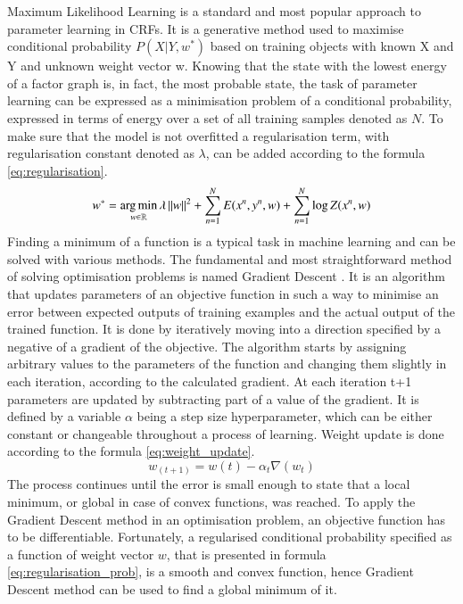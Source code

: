 Maximum Likelihood Learning is a standard and most popular approach to parameter learning in CRFs. It is a generative method used to maximise conditional probability $P(X|Y,w^*)$ based on training objects with known X and Y and unknown weight vector w. Knowing that the state with the lowest energy of a factor graph is, in fact, the most probable state, the task of parameter learning can be expressed as a minimisation problem of a conditional probability, expressed in terms of energy over a set of all training samples denoted as $N$. To make sure that the model is not overfitted a regularisation term, with regularisation constant denoted as $\lambda$, can be added according to the formula \ref{eq:regularisation}.
\begin{equation}
    \label{eq:regularisation}
    w^* = \operatorname*{arg\,min}_{w \in \mathbb{R}}{\lambda \left \| w \right \|^2} + \sum_{n=1}^{N}{E(x^n,y^n,w)} + \sum_{n=1}^{N}{\log{Z}(x^n,w)}
\end{equation}
Finding a minimum of a function is a typical task in machine learning and can be solved with various methods. The fundamental and most straightforward method of solving optimisation problems is named Gradient Descent \cite{optimisation_deep_learning}. It is an algorithm that updates parameters of an objective function in such a way to minimise an error between expected outputs of training examples and the actual output of the trained function. It is done by iteratively moving into a direction specified by a negative of a gradient of the objective. The algorithm starts by assigning arbitrary values to the parameters of the function and changing them slightly in each iteration, according to the calculated gradient. At each iteration t+1 parameters are updated by subtracting part of a value of the gradient. It is defined by a variable $\alpha$ being a step size hyperparameter, which can be either constant or changeable throughout a process of learning. Weight update is done according to the formula \ref{eq:weight_update}.
\begin{equation}
    \label{eq:weight_update}
    w_{(t+1)} = w(t) - \alpha_t \nabla (w_t)
\end{equation}
The process continues until the error is small enough to state that a local minimum, or global in case of convex functions, was reached. To apply the Gradient Descent method in an optimisation problem, an objective function has to be differentiable. Fortunately, a regularised conditional probability specified as a function of weight vector $w$, that is presented in formula \ref{eq:regularisation_prob}, is a smooth and convex function, hence Gradient Descent method can be used to find a global minimum of it.
